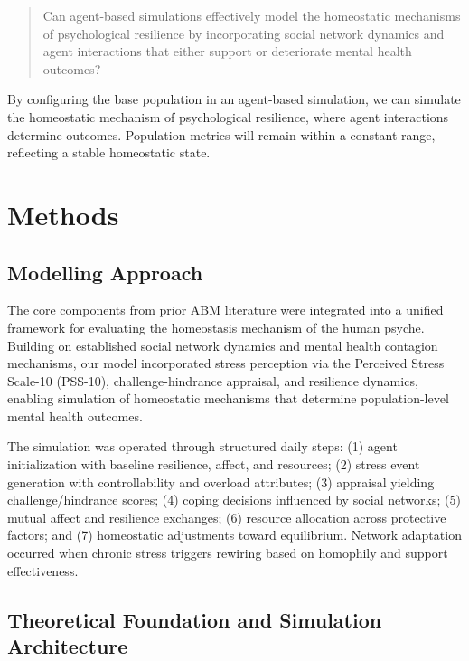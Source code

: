 \documentclass[
  letterpaper,
  DIV=11,
  numbers=noendperiod]{scrartcl}
\begin{document}
\begin{quote}
Can agent-based simulations effectively model the homeostatic mechanisms
of psychological resilience by incorporating social network dynamics and
agent interactions that either support or deteriorate mental health
outcomes?
\end{quote}

By configuring the base population in an agent-based simulation, we can
simulate the homeostatic mechanism of psychological resilience, where
agent interactions determine outcomes. Population metrics will remain
within a constant range, reflecting a stable homeostatic state.

\section{Methods}\label{methods}

\subsection{Modelling Approach}\label{modelling-approach}

The core components from prior ABM literature
\citep{Romanyukha2023, Murase2021, Andarlia2021, Lopez2024, Benny2022}
were integrated into a unified framework for evaluating the homeostasis
mechanism of the human psyche. Building on established social network
dynamics and mental health contagion mechanisms, our model incorporated
stress perception via the Perceived Stress Scale-10 (PSS-10),
challenge-hindrance appraisal, and resilience dynamics, enabling
simulation of homeostatic mechanisms that determine population-level
mental health outcomes.

The simulation was operated through structured daily steps: (1) agent
initialization with baseline resilience, affect, and resources; (2)
stress event generation with controllability and overload attributes;
(3) appraisal yielding challenge/hindrance scores; (4) coping decisions
influenced by social networks; (5) mutual affect and resilience
exchanges; (6) resource allocation across protective factors; and (7)
homeostatic adjustments toward equilibrium. Network adaptation occurred
when chronic stress triggers rewiring based on homophily and support
effectiveness.

\subsection{Theoretical Foundation and Simulation
Architecture}\label{theoretical-foundation-and-simulation-architecture}
\end{document}
